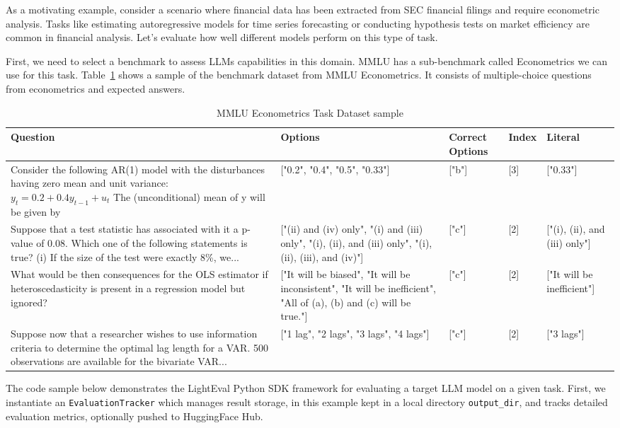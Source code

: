 As a motivating example, consider a scenario where financial data has been extracted from SEC financial filings and require econometric analysis. Tasks like estimating autoregressive models for time series forecasting or conducting hypothesis tests on market efficiency are common in financial analysis. Let's evaluate how well different models perform on this type of task.

First, we need to select a benchmark to assess LLMs capabilities in this domain. MMLU has a sub-benchmark called Econometrics we can use for this task. Table~\ref{mmlu-econometrics} shows a sample of the benchmark dataset from MMLU Econometrics. It consists of multiple-choice questions from econometrics and expected answers.

\begin{table*}[h]
\caption{MMLU Econometrics Task Dataset sample}
\label{mmlu-econometrics}
\begin{tabular}{p{}p{}p{}p{}p{}}
\hline
Question & Options & Correct Options & Index & Literal \\
\hline
Consider the following AR(1) model with the disturbances having zero mean and unit variance: $y_t = 0.2 + 0.4 y_{t-1} + u_t$ The (unconditional) mean of y will be given by & ["0.2", "0.4", "0.5", "0.33"] & ["b"] & [3] & ["0.33"] \\
\hline
Suppose that a test statistic has associated with it a p-value of 0.08. Which one of the following statements is true? (i) If the size of the test were exactly 8\%, we... & ["(ii) and (iv) only", "(i) and (iii) only", "(i), (ii), and (iii) only", "(i), (ii), (iii), and (iv)"] & ["c"] & [2] & ["(i), (ii), and (iii) only"] \\
\hline
What would be then consequences for the OLS estimator if heteroscedasticity is present in a regression model but ignored? & ["It will be biased", "It will be inconsistent", "It will be inefficient", "All of (a), (b) and (c) will be true."] & ["c"] & [2] & ["It will be inefficient"] \\
\hline
Suppose now that a researcher wishes to use information criteria to determine the optimal lag length for a VAR. 500 observations are available for the bivariate VAR... & ["1 lag", "2 lags", "3 lags", "4 lags"] & ["c"] & [2] & ["3 lags"] \\
\hline
\end{tabular}
\end{table*}
The code sample below demonstrates the LightEval Python SDK framework for evaluating a target LLM model on a given task. First, we instantiate an \texttt{EvaluationTracker} which manages result storage, in this example kept in a local directory \texttt{output\_dir}, and tracks detailed evaluation metrics, optionally pushed to HuggingFace Hub.

